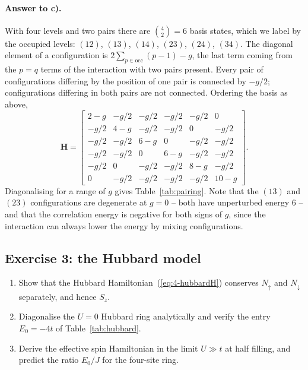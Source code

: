 \paragraph{Answer to c).}
With four levels and two pairs there are $\binom{4}{2}=6$ basis states, which
we label by the occupied levels: $(12)$, $(13)$, $(14)$, $(23)$, $(24)$,
$(34)$.  The diagonal element of a configuration is
$2\sum_{p\in\mathrm{occ}}(p-1) - g$, the last term coming from the $p=q$ terms
of the interaction with two pairs present.  Every pair of configurations
differing by the position of one pair is connected by $-g/2$; configurations
differing in both pairs are not connected.  Ordering the basis as above,
\begin{equation}
  \bm{H} =
  \begin{bmatrix}
    2-g & -g/2 & -g/2 & -g/2 & -g/2 & 0\\
    -g/2 & 4-g & -g/2 & -g/2 & 0 & -g/2\\
    -g/2 & -g/2 & 6-g & 0 & -g/2 & -g/2\\
    -g/2 & -g/2 & 0 & 6-g & -g/2 & -g/2\\
    -g/2 & 0 & -g/2 & -g/2 & 8-g & -g/2\\
    0 & -g/2 & -g/2 & -g/2 & -g/2 & 10-g
  \end{bmatrix}.
  \label{eq:4-exp3}
\end{equation}
Diagonalising for a range of $g$ gives Table~\ref{tab:pairing}.  Note that the
$(13)$ and $(23)$ configurations are degenerate at $g=0$ -- both have
unperturbed energy $6$ -- and that the correlation energy is negative for both
signs of $g$, since the interaction can always lower the energy by mixing
configurations.

\subsection*{Exercise 3: the Hubbard model}
\label{ex:4-hubbard}

\begin{enumerate}
  \item[a)] Show that the Hubbard Hamiltonian~(\ref{eq:4-hubbardH}) conserves
  $N_{\uparrow}$ and $N_{\downarrow}$ separately, and hence $S_z$.
  \item[b)] Diagonalise the $U=0$ Hubbard ring analytically and verify the
  entry $E_0=-4t$ of Table~\ref{tab:hubbard}.
  \item[c)] Derive the effective spin Hamiltonian in the limit $U\gg t$ at
  half filling, and predict the ratio $E_0/J$ for the four-site ring.
\end{enumerate}

